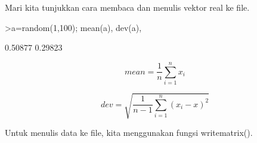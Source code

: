\documentclass[a4paper,10pt]{article}
\begin{document}
\begin{eulernotebook}
\begin{eulercomment}
\begin{eulercomment}
\begin{eulercomment}
\begin{eulercomment}
\begin{eulercomment}
\begin{eulercomment}
\begin{eulercomment}
\begin{eulercomment}
\begin{eulercomment}
\begin{eulercomment}
\begin{eulercomment}
\begin{eulercomment}
\begin{eulercomment}
\begin{eulercomment}
\begin{eulercomment}
Mari kita tunjukkan cara membaca dan menulis vektor real ke file.
\end{eulercomment}
\begin{eulerprompt}
>a=random(1,100); mean(a), dev(a),
\end{eulerprompt}
\begin{euleroutput}
  0.50877
  0.29823
\end{euleroutput}
\begin{eulerformula}
\[
mean= \frac{1}{n} \sum_{i=1}^n x_i
\]
\end{eulerformula}
\begin{eulerformula}
\[
dev= \sqrt{\frac{1}{n-1}\sum_{i=1}^n(x_i-x)^2}
\]
\end{eulerformula}
\begin{eulercomment}
Untuk menulis data ke file, kita menggunakan fungsi writematrix().


\end{eulercomment}
\end{eulercomment}
\end{eulercomment}
\end{eulercomment}
\end{eulercomment}
\end{eulercomment}
\end{eulercomment}
\end{eulercomment}
\end{eulercomment}
\end{eulercomment}
\end{eulercomment}
\end{eulercomment}
\end{eulercomment}
\end{eulercomment}
\end{eulercomment}
\end{eulernotebook}
\end{document}
